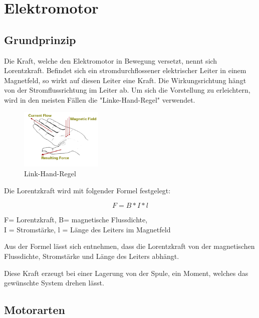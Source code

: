 \documentclass[12pt]{scrreprt} %
\begin{document}
\newpage

\section{Elektromotor}
\label{sec:elektromotor}

\subsection{Grundprinzip}
\label{sec:grundprinzip}

Die Kraft, welche den Elektromotor in Bewegung versetzt, nennt sich Lorentzkraft.
Befindet sich ein stromdurchflossener elektrischer Leiter in einem Magnetfeld, so wirkt auf diesen Leiter eine Kraft.
Die Wirkungsrichtung hängt von der Stromflussrichtung im Leiter ab. 
Um sich die Vorstellung zu erleichtern, wird in den meisten Fällen die "Linke-Hand-Regel" verwendet.

\begin{figure}[!ht]
\begin{center}
	\caption{Link-Hand-Regel}
	\includegraphics[width=0.35\textwidth]{LinkehandRegel}
\end{center}
\end{figure}

Die Lorentzkraft wird mit folgender Formel festgelegt:

\begin{equation}
\label{eq:1}
 F = B * I * l
\end{equation}
\begin{center}
F= Lorentzkraft, B= magnetische Flussdichte, \\ I = Stromstärke, l = Länge des Leiters im Magnetfeld
\end{center}

Aus der Formel lässt sich entnehmen, dass die Lorentzkraft von der magnetischen Flussdichte, Stromstärke und Länge des Leiters abhängt.

Diese Kraft erzeugt bei einer Lagerung von der Spule, ein Moment, welches das gewünschte System drehen lässt.

\subsection{Motorarten}
\label{sec:motorarten}
\end{document}
